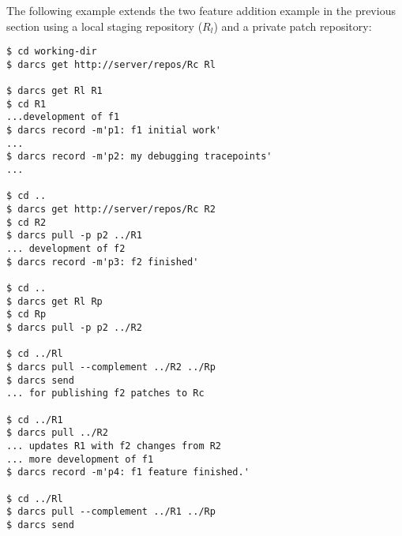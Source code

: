 The following example extends the two feature addition example in the
previous section using a local staging repository ($R_l$) and a
private patch repository:

\begin{verbatim}
$ cd working-dir
$ darcs get http://server/repos/Rc Rl

$ darcs get Rl R1
$ cd R1
...development of f1
$ darcs record -m'p1: f1 initial work'
...
$ darcs record -m'p2: my debugging tracepoints'
...

$ cd ..
$ darcs get http://server/repos/Rc R2
$ cd R2
$ darcs pull -p p2 ../R1
... development of f2
$ darcs record -m'p3: f2 finished'

$ cd ..
$ darcs get Rl Rp
$ cd Rp
$ darcs pull -p p2 ../R2

$ cd ../Rl
$ darcs pull --complement ../R2 ../Rp
$ darcs send
... for publishing f2 patches to Rc

$ cd ../R1
$ darcs pull ../R2
... updates R1 with f2 changes from R2
... more development of f1
$ darcs record -m'p4: f1 feature finished.'

$ cd ../Rl
$ darcs pull --complement ../R1 ../Rp
$ darcs send
\end{verbatim}

